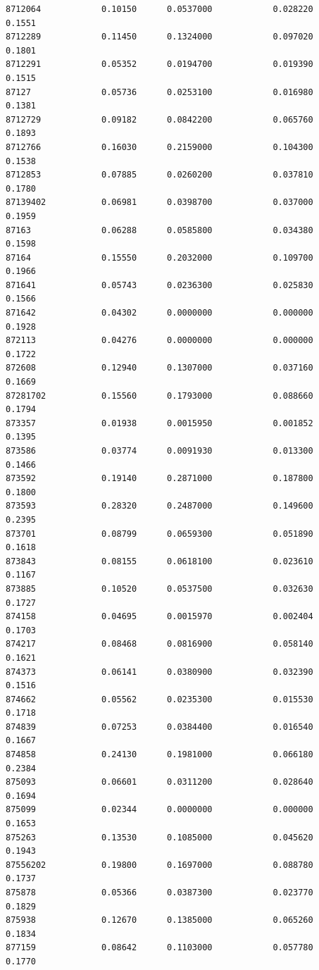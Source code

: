 \documentclass[
  letterpaper,
  DIV=11,
  numbers=noendperiod]{scrartcl}
\begin{document}
\begin{verbatim}
8712064            0.10150      0.0537000            0.028220        0.1551
8712289            0.11450      0.1324000            0.097020        0.1801
8712291            0.05352      0.0194700            0.019390        0.1515
87127              0.05736      0.0253100            0.016980        0.1381
8712729            0.09182      0.0842200            0.065760        0.1893
8712766            0.16030      0.2159000            0.104300        0.1538
8712853            0.07885      0.0260200            0.037810        0.1780
87139402           0.06981      0.0398700            0.037000        0.1959
87163              0.06288      0.0585800            0.034380        0.1598
87164              0.15550      0.2032000            0.109700        0.1966
871641             0.05743      0.0236300            0.025830        0.1566
871642             0.04302      0.0000000            0.000000        0.1928
872113             0.04276      0.0000000            0.000000        0.1722
872608             0.12940      0.1307000            0.037160        0.1669
87281702           0.15560      0.1793000            0.088660        0.1794
873357             0.01938      0.0015950            0.001852        0.1395
873586             0.03774      0.0091930            0.013300        0.1466
873592             0.19140      0.2871000            0.187800        0.1800
873593             0.28320      0.2487000            0.149600        0.2395
873701             0.08799      0.0659300            0.051890        0.1618
873843             0.08155      0.0618100            0.023610        0.1167
873885             0.10520      0.0537500            0.032630        0.1727
874158             0.04695      0.0015970            0.002404        0.1703
874217             0.08468      0.0816900            0.058140        0.1621
874373             0.06141      0.0380900            0.032390        0.1516
874662             0.05562      0.0235300            0.015530        0.1718
874839             0.07253      0.0384400            0.016540        0.1667
874858             0.24130      0.1981000            0.066180        0.2384
875093             0.06601      0.0311200            0.028640        0.1694
875099             0.02344      0.0000000            0.000000        0.1653
875263             0.13530      0.1085000            0.045620        0.1943
87556202           0.19800      0.1697000            0.088780        0.1737
875878             0.05366      0.0387300            0.023770        0.1829
875938             0.12670      0.1385000            0.065260        0.1834
877159             0.08642      0.1103000            0.057780        0.1770

\end{verbatim}
\end{document}
